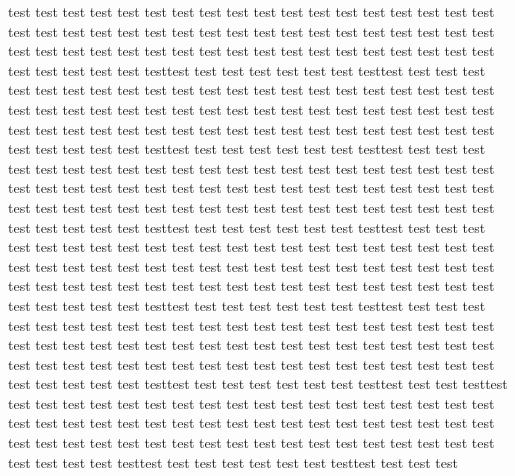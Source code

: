 test test test test test test test test test test test test test test test test test test test test test test test test test test test test test test test test test test test test test test test test test test test test test test test test test test test test test test test test test test test testtest test test test test test test testtest test test test
test test test test test test test test test test test test test test test test test test test test test test test test test test test test test test test test test test test test test test test test test test test test test test test test test test test test test test test test test test test testtest test test test test test test testtest test test test
test test test test test test test test test test test test test test test test test test test test test test test test test test test test test test test test test test test test test test test test test test test test test test test test test test test test test test test test test test test testtest test test test test test test testtest test test test
test test test test test test test test test test test test test test test test test test test test test test test test test test test test test test test test test test test test test test test test test test test test test test test test test test test test test test test test test test test testtest test test test test test test testtest test test test
test test test test test test test test test test test test test test test test test test test test test test test test test test test test test test test test test test test test test test test test test test test test test test test test test test test test test test test test test test test testtest test test test test test test testtest test test testtest test test test test test test test test test test test test test test test test test test test test test test test test test test test test test test test test test test test test test test test test test test test test test test test test test test test test test test test test test test testtest test test test test test test testtest test test test
